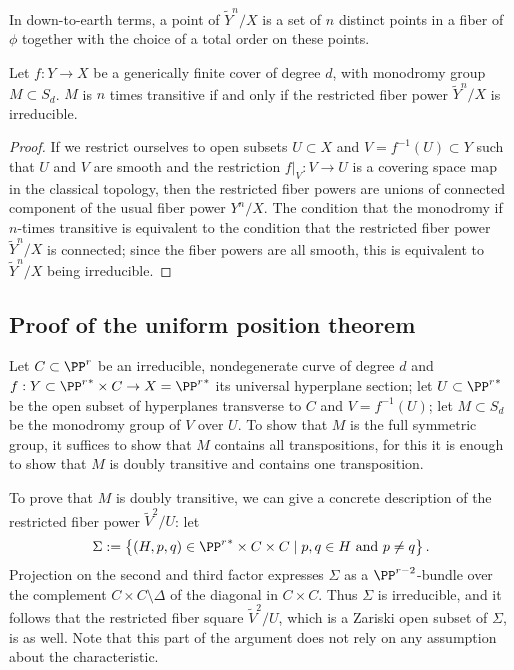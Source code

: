 In down-to-earth terms, a point of $\tilde Y^n/X$ is a set of $n$ distinct points in a fiber of $\phi$ together with
the choice of a total order on these points. 

\begin{lemma}\label{transitivity lemma}
Let $f : Y \to X$ be a generically finite cover of degree $d$, with  monodromy group $M \subset S_d$.
$M$ is $n$ times transitive if and only if the restricted fiber power $\tilde Y^n/X$ is irreducible.
\end{lemma}

\begin{proof}
If we restrict ourselves to open subsets $U \subset X$ and $V = f^{-1}(U) \subset Y$ such that $U$ and $V$ are smooth and the restriction $f|_V : V \to U$ is a covering space map in the classical topology, then the restricted fiber powers are unions of connected component of the usual fiber power $Y^n/X$. The condition that the monodromy if $n$-times transitive is equivalent to the condition that the restricted fiber power $\tilde Y^n/X$ is connected; since the fiber powers are all smooth, this is equivalent to $\tilde Y^n/X$ being irreducible.
\end{proof}


\subsection{Proof of the uniform position theorem}

Let $C \subset \PP^r$ be an irreducible, nondegenerate curve of degree $d$ and $f : Y \subset {\PP^r}^* \times C \to  X = {\PP^r}^*$ its universal hyperplane section; let $U \subset {\PP^r}^*$ be the open subset of hyperplanes transverse to $C$ and $V = f^{-1}(U)$; let $M \subset S_d$ be the monodromy group of $V$ over $U$.
To show that  $M$ is the full symmetric group, it suffices to show that $M$ contains all transpositions, for this it is enough to show that $M$ is doubly transitive and contains one transposition.

To prove that $M$ is doubly transitive, we can give a concrete description of the restricted fiber power $\tilde V^2/U$: let
$$
\Sigma := \left\{ (H, p, q) \in {\PP^r}^* \times C \times C \mid p, q \in H \text{ and } p \neq q \right\}.
$$
Projection on the second and third factor expresses $\Sigma$ as a $\PP^{r-2}$-bundle over the complement $C \times C \setminus \Delta$ of the diagonal in $C \times C$. Thus $\Sigma$ is irreducible, and it follows that the restricted fiber square $\tilde V^2/U$, which is a Zariski open subset of $\Sigma$, is as well. Note that this part of the argument does not rely on any assumption about the characteristic.

